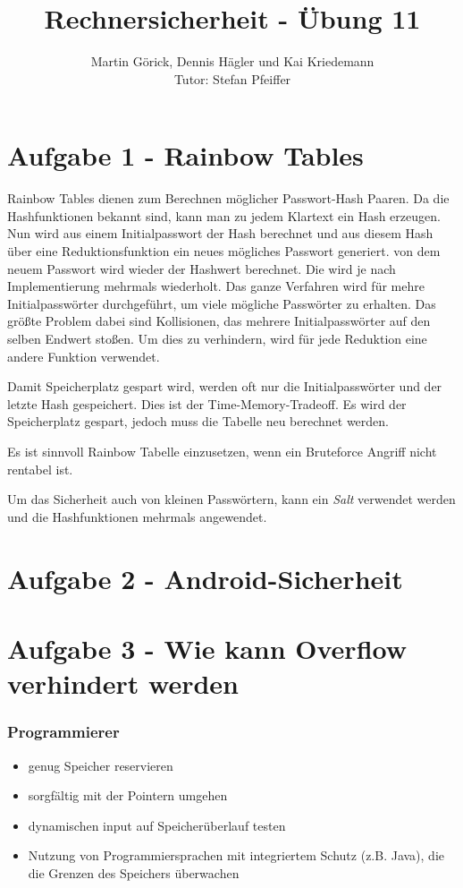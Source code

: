 \documentclass{scrartcl}
\title{Rechnersicherheit - Übung 11}
\author{Martin Görick, Dennis Hägler und Kai Kriedemann \\ Tutor: Stefan Pfeiffer}
\begin{document}
\maketitle


\section*{Aufgabe 1 - Rainbow Tables}

Rainbow Tables dienen zum Berechnen möglicher Passwort-Hash Paaren.
Da die Hashfunktionen bekannt sind, kann man zu jedem Klartext ein Hash erzeugen.
Nun wird aus einem Initialpasswort der Hash berechnet und aus diesem Hash über eine Reduktionsfunktion ein neues mögliches Passwort generiert.
von dem neuem Passwort wird wieder der Hashwert berechnet.
Die wird je nach Implementierung mehrmals wiederholt.
Das ganze Verfahren wird für mehre Initialpasswörter durchgeführt, um viele mögliche Passwörter zu erhalten.
Das größte Problem dabei sind Kollisionen, das mehrere Initialpasswörter auf den selben Endwert stoßen.
Um dies zu verhindern, wird für jede Reduktion eine andere Funktion verwendet.


Damit Speicherplatz gespart wird, werden oft nur die Initialpasswörter und der letzte Hash gespeichert. 
Dies ist der Time-Memory-Tradeoff.
Es wird der Speicherplatz gespart, jedoch muss die Tabelle neu berechnet werden.


Es ist sinnvoll Rainbow Tabelle einzusetzen, wenn ein Bruteforce Angriff nicht rentabel ist.


Um das Sicherheit auch von kleinen Passwörtern, kann ein \textit{Salt} verwendet werden und die Hashfunktionen mehrmals angewendet.

\section*{Aufgabe 2 - Android-Sicherheit}



\section*{Aufgabe 3 - Wie kann Overflow verhindert werden}
\subsubsection*{Programmierer}
  \begin{itemize}
    \item genug Speicher reservieren
    \item sorgfältig mit der Pointern umgehen
    \item dynamischen input auf Speicherüberlauf testen
    \item Nutzung von Programmiersprachen mit integriertem Schutz (z.B. Java),
      die die Grenzen des Speichers überwachen
  \end{itemize}
\end{document}
